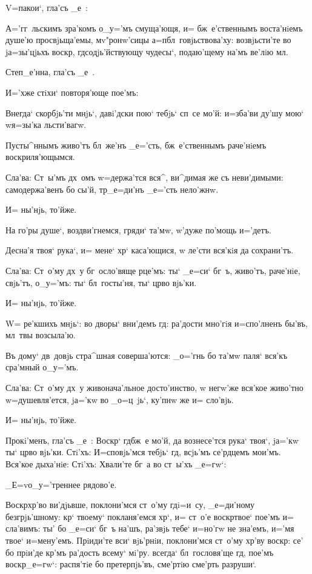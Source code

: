 V=пакои`, гла'съ _е~:

А='гг~льскимъ зра'комъ о_у='мъ смуща'ющя, и= 
бж~е'ственнымъ воста'нiемъ душе'ю просвjьща'емы, 
мv"ронw'сицы а=п бл~говjьствова'ху: возвjьсти'те во 
jа=зы'цjьхъ воскр, гд содjь'йствующу чудесы`, 
подаю'щему на'мъ ве'лiю мл.

Степ_е'нна, гла'съ _е~. %

И='хже стiхи` повторя'юще пое'мъ:

Внегда` скорбjь'ти мнjь`, давi'дски пою` тебjь` сп~се 
мо'й: и=зба'ви ду'шу мою` w\т я=зы'ка льсти'вагw.

Пусты^ннымъ живо'тъ бл~же'нъ _е='сть, бж~е'ственнымъ 
раче'нiемъ воскриля'ющымся. 

Сла'ва: Ст~ы'мъ дх~омъ w=держа'тся вся^, ви^димая же 
съ неви'димыми: самодержа'венъ бо сы'й, тр _е=ди'нъ 
_е='сть нело'жнw. 

И= ны'нjь, то'йже. %

На го'ры душе`, воздви'гнемся, гряди` та'мw, 
w'дуже по'мощь и='детъ.

Десна'я твоя` рука`, и= мене` хр` каса'ющися, w\т 
ле'сти вся'кiя да сохрани'тъ.

Сла'ва: Ст~о'му дх~у бг~осло'вяще рце'мъ: ты` _е=си` 
бг~ъ, живо'тъ, раче'нiе, свjь'тъ, о_у='мъ: ты` 
бл~госты'ня, ты` цр во вjь'ки. 

И= ны'нjь, то'йже. %

W= ре'кшихъ мнjь`: во дворы` вни'демъ гд: ра'дости 
мно'гiя и=спо'лненъ бы'въ, мл~твы возсыла'ю.

Въ дому` дв~довjь стра^шная соверша'ются: _о='гнь бо 
та'мw паля` вся'къ сра'мный о_у='мъ.

Сла'ва: Ст~о'му дх~у живонача'льное досто'инство, w\т 
негw'же вся'кое живо'тно w=душевля'ется, jа='кw во 
_о=ц~jь`, ку'пнw же и= сло'вjь.

И= ны'нjь, то'йже.

Прокi'менъ, гла'съ _е~: Воскр` гд бж~е мо'й, да 
вознесе'тся рука` твоя`, jа='кw ты` цр во вjь'ки. 
Стi'хъ: И=сповjь'мся тебjь` гд, всjь'мъ се'рдцемъ 
мои'мъ. Вся'кое дыха'нiе: Стi'хъ: Хвали'те бг~а во 
ст~ы'хъ _е=гw`:

_Е=v о_у='треннее рядово'е.

Воскр хр'во ви'дjьвше, поклони'мся ст~о'му 
гд i=и~су, _е=ди'ному безгрjь'шному: кр` твоему` 
покланя'емся хр`, и= ст~о'е воскр твое` пое'мъ 
и= сла'вимъ: ты' бо _е=си` бг~ъ на'шъ, ра'звjь тебе` 
и=но'гw не зна'емъ, и='мя твое` и=мену'емъ. Прiиди'те 
вси` вjь'рнiи, поклони'мся ст~о'му хр'ву воскр: 
се' бо прiи'де кр'мъ ра'дость всему` мi'ру. всегда` 
бл~гословя'ще гд, пое'мъ воскр _е=гw`: распя'тiе 
бо претерпjь'въ, сме'ртiю сме'рть разруши`. 

